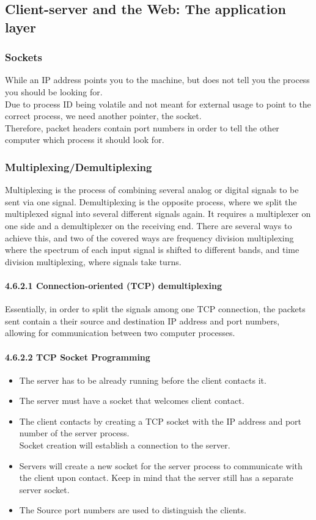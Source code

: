 \documentclass{article}
\begin{document}
\subsection{Client-server and the Web: The application layer}
\subsubsection{Sockets}
While an IP address points you to the machine, but does not tell you the process you should be looking for.\\
Due to process ID being volatile and not meant for external usage to point to the correct process, we need another pointer, the socket.\\
Therefore, packet headers contain port numbers in order to tell the other computer which process it should look for.
\subsubsection{Multiplexing/Demultiplexing}
Multiplexing is the process of combining several analog or digital signals to be sent via one signal. Demultiplexing is the opposite process, where we split the multiplexed signal into several different signals again. It requires a multiplexer on one side and a demultiplexer on the receiving end. There are several ways to achieve this, and two of the covered ways are frequency division multiplexing where the spectrum of each input signal is shifted to different bands, and time division multiplexing, where signals take turns.\\
\paragraph{4.6.2.1 Connection-oriented (TCP) demultiplexing}
Essentially, in order to split the signals among one TCP connection, the packets sent contain a their source and destination IP address and port numbers, allowing for communication between two computer processes.\\
\paragraph{4.6.2.2 TCP Socket Programming}
\begin{itemize}
    \item The server has to be already running before the client contacts it. 
    \item The server must have a socket that welcomes client contact.
    \item The client contacts by creating a TCP socket with the IP address and port number of the server process.\\ Socket creation will establish a connection to the server.
    \item Servers will create a new socket for the server process to communicate with the client upon contact. Keep in mind that the server still has a separate server socket. \item The Source port numbers are used to distinguish the clients.
\end{itemize}
\end{document}
